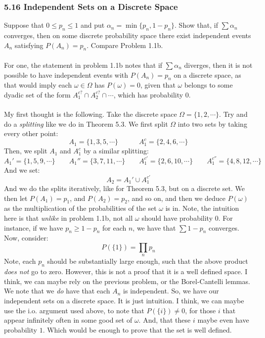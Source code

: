 \documentclass[12pt,a4paper]{article}
\newcommand{\1}[1]{\mathbbm{1}\left\{ #1 \right\}}
\newcommand{\io}{\text{i.o.}}
\begin{document}
\subsubsection{5.16 Independent Sets on a Discrete Space} Suppose that $0 \leq p_n \leq 1$ and put $\alpha_n = \min\{p_n,1-p_n\}$. Show that, if $\sum \alpha_n$ converges, then on some discrete probability space there exist independent events $A_n$ satisfying $P(A_n) = p_n$. Compare Problem 1.1b.
\\\\
For one, the statement in problem 1.1b notes that if $\sum \alpha_n$ diverges, then it is not possible to have independent events with $P(A_n) = p_n$ on a discrete space, as that would imply each $\omega \in \Omega$ has $P(\omega) = 0$, given that $\omega$ belongs to some dyadic set of the form $A_1^{c?} \cap A_2^{c?} \cap \cdots$, which has probability $0$.
\\\\
My first thought is the following. Take the discrete space $\Omega = \{1, 2, \cdots\}$. Try and do a \textit{splitting} like we do in Theorem 5.3. We first split $\Omega$ into two sets by taking every other point:
$$
	A_1 = \{1, 3, 5, \cdots\} \quad\quad\quad A_1^c = \{2, 4, 6, \cdots\}
$$
Then, we split $A_1$ and $A_1^c$ by a similar splitting:
$$
	A_1' = \{1, 5, 9, \cdots\} \quad\quad A_1'' = \{3, 7, 11, \cdots\} \quad\quad
	A_1^{c'} = \{2, 6, 10, \cdots\} \quad\quad A_1^{c''} = \{4, 8, 12, \cdots\}
$$
And we set:
$$
	A_2 = A_1' \cup A_1^{c'}
$$
And we do the splits iteratively, like for Theorem 5.3, but on a discrete set. We then let $P(A_1) = p_1$, and $P(A_2) = p_2$, and so on, and then we deduce $P(\omega)$ as the multiplication of the probabilities of the set $\omega$ is in. Note, the intuition here is that \textit{unlike} in problem 1.1b, not all $\omega$ should have probability $0$. For instance, if we have $p_n \geq 1-p_n$ for each $n$, we have that $\sum 1-p_n$ converges. Now, consider:
$$
	P(\{1\}) = \prod_n p_n
$$
Note, each $p_n$ should be substantially large enough, such that the above product \textit{does not} go to zero. However, this is not a proof that it is a well defined space. I think, we can maybe rely on the previous problem, or the Borel-Cantelli lemmas. We note that we \textit{do} have that each $A_n$ is independent. So, we have our independent sets on a discrete space. It is just intuition. I think, we can maybe use the $\io$ argument used above, to note that $P(\{i\}) \neq 0$, for those $i$ that appear infinitely often in some good set of $\omega$. And, that these $i$ maybe even have probability $1$. Which would be enough to prove that the set is well defined.
\end{document}
